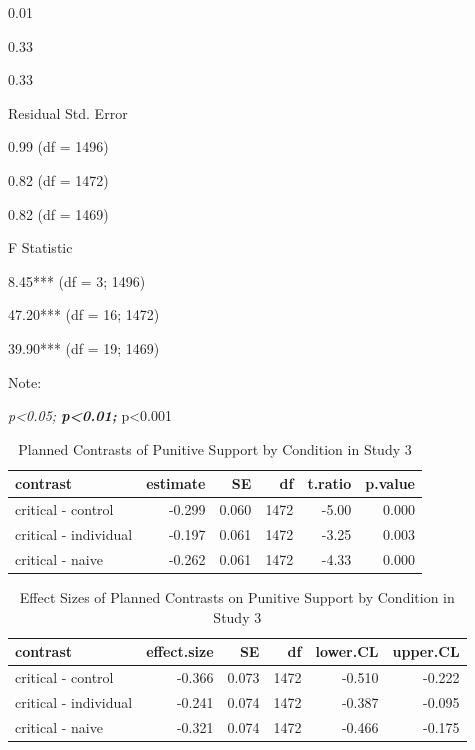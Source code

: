 \documentclass[
]{book}
\begin{document}
0.01

0.33

0.33

Residual Std. Error

0.99 (df = 1496)

0.82 (df = 1472)

0.82 (df = 1469)

F Statistic

8.45*** (df = 3; 1496)

47.20*** (df = 16; 1472)

39.90*** (df = 19; 1469)

Note:

\emph{p\textless0.05; \textbf{p\textless0.01; }}p\textless0.001

\begin{table}

\caption{\label{tab:pun-contrast-s3}Planned Contrasts of Punitive Support by Condition in Study 3}
\centering
\fontsize{13}{15}\selectfont
\begin{tabular}[t]{lrrrrr}
\toprule
contrast & estimate & SE & df & t.ratio & p.value\\
\midrule
critical - control & -0.299 & 0.060 & 1472 & -5.00 & 0.000\\
critical - individual & -0.197 & 0.061 & 1472 & -3.25 & 0.003\\
critical - naive & -0.262 & 0.061 & 1472 & -4.33 & 0.000\\
\bottomrule
\end{tabular}
\end{table}

\begin{table}

\caption{\label{tab:pun-contrast-s3}Effect Sizes of Planned Contrasts on Punitive Support by Condition in Study 3}
\centering
\fontsize{13}{15}\selectfont
\begin{tabular}[t]{lrrrrr}
\toprule
contrast & effect.size & SE & df & lower.CL & upper.CL\\
\midrule
critical - control & -0.366 & 0.073 & 1472 & -0.510 & -0.222\\
critical - individual & -0.241 & 0.074 & 1472 & -0.387 & -0.095\\
critical - naive & -0.321 & 0.074 & 1472 & -0.466 & -0.175\\
\bottomrule
\end{tabular}
\end{table}
\end{document}
